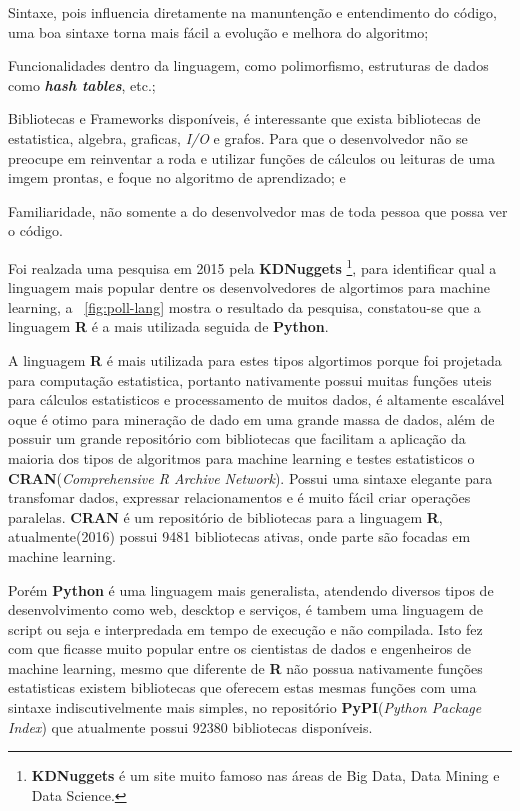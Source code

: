 \begin{alineas}
    \item Sintaxe, pois influencia diretamente na manuntenção e entendimento do código, uma boa sintaxe torna mais fácil a evolução e melhora do algoritmo;
    \item Funcionalidades dentro da linguagem, como polimorfismo, estruturas de dados como \textbf{\textit{hash tables}}, etc.; 
    \item Bibliotecas e Frameworks disponíveis, é interessante que exista bibliotecas de estatistica, algebra, graficas, \textit{I/O} e grafos. Para que
          o desenvolvedor não se preocupe em reinventar a roda e utilizar funções de cálculos ou leituras de uma imgem prontas, e foque no algoritmo de 
          aprendizado; e
    \item Familiaridade, não somente a do desenvolvedor mas de toda pessoa que possa ver o código.     
\end{alineas}

Foi realzada uma pesquisa em 2015 pela \textbf{KDNuggets} \footnote{\textbf{KDNuggets} é um site muito famoso nas áreas de Big Data, Data Mining e Data Science.}, para identificar qual a linguagem mais popular dentre os desenvolvedores de algortimos para 
machine learning, a ~\autoref{fig:poll-lang} mostra o resultado da pesquisa, constatou-se que a linguagem \textbf{R} é a mais utilizada seguida de 
\textbf{Python}.   


A linguagem \textbf{R} é mais utilizada para estes tipos algortimos porque foi projetada para computação estatistica, portanto 
nativamente possui muitas funções uteis para cálculos estatisticos e processamento de muitos dados, é 
altamente escalável oque é otimo para mineração de dado em uma grande massa de dados, além de possuir um grande repositório com 
bibliotecas que facilitam a aplicação da maioria dos tipos de algoritmos para machine learning e testes estatisticos o 
\textbf{CRAN}(\textit{Comprehensive R Archive Network}). 
Possui uma sintaxe elegante para transfomar dados, expressar relacionamentos e é muito fácil criar operações paralelas.
\textbf{CRAN} é um repositório de bibliotecas para a linguagem \textbf{R}, atualmente(2016) possui 9481 bibliotecas ativas, 
onde parte são focadas em machine learning.


Porém \textbf{Python} é uma linguagem mais generalista, atendendo diversos tipos de desenvolvimento como web, descktop e serviços, 
é tambem uma linguagem de script ou seja e interpredada em tempo de execução e não compilada. 
Isto fez com que ficasse muito popular entre os cientistas de dados e engenheiros de machine learning, mesmo que diferente de 
\textbf{R} não possua nativamente funções estatisticas existem bibliotecas que oferecem estas mesmas funções com uma sintaxe
indiscutivelmente mais simples, no repositório \textbf{PyPI}(\textit{Python Package Index}) que atualmente possui 92380 bibliotecas disponíveis.      

